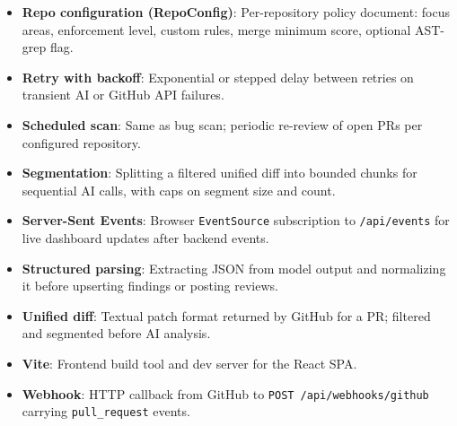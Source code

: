 \begin{itemize}
\item \textbf{Repo configuration (RepoConfig)}: Per-repository policy document: focus areas, enforcement level, custom rules, merge minimum score, optional AST-grep flag.
\item \textbf{Retry with backoff}: Exponential or stepped delay between retries on transient AI or GitHub API failures.
\item \textbf{Scheduled scan}: Same as bug scan; periodic re-review of open PRs per configured repository.
\item \textbf{Segmentation}: Splitting a filtered unified diff into bounded chunks for sequential AI calls, with caps on segment size and count.
\item \textbf{Server-Sent Events}: Browser \texttt{EventSource} subscription to \texttt{/api/events} for live dashboard updates after backend events.
\item \textbf{Structured parsing}: Extracting JSON from model output and normalizing it before upserting findings or posting reviews.
\item \textbf{Unified diff}: Textual patch format returned by GitHub for a PR; filtered and segmented before AI analysis.
\item \textbf{Vite}: Frontend build tool and dev server for the React SPA.
\item \textbf{Webhook}: HTTP callback from GitHub to \texttt{POST /api/webhooks/github} carrying \texttt{pull\_request} events.
\end{itemize}
